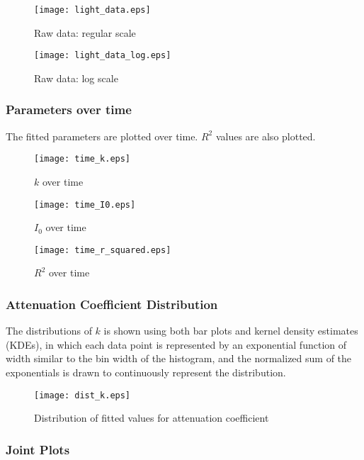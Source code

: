\begin{figure}[H]
	\centering
	\texttt{[image: light\_data.eps]}
	\caption{Raw data: regular scale}
\end{figure}

\begin{figure}[H]
	\centering
	\texttt{[image: light\_data\_log.eps]}
	\caption{Raw data: log scale}
\end{figure}

\pagebreak
\subsubsection{Parameters over time}
The fitted parameters are plotted over time. $R^2$ values are also plotted.

\begin{figure}[H]
	\centering
	\texttt{[image: time\_k.eps]}
	\caption{$k$ over time}
	\label{time_k}
\end{figure}

\begin{figure}[H]
	\centering
	\texttt{[image: time\_I0.eps]}
	\caption{$I_0$ over time}
	\label{time_I0}
\end{figure}

\begin{figure}[H]
	\centering
	\texttt{[image: time\_r\_squared.eps]}
	\caption{$R^2$ over time}
	\label{time_r_squared}
\end{figure}

\subsubsection{Attenuation Coefficient Distribution}
The distributions of $k$ is shown using both bar plots and kernel density estimates (KDEs), in which each data point is represented by an exponential function of width similar to the bin width of the histogram, and the normalized sum of the exponentials is drawn to continuously represent the distribution.

\begin{figure}[H]
	\centering
	\texttt{[image: dist\_k.eps]}
	\caption{Distribution of fitted values for attenuation coefficient}
\end{figure}

\subsubsection{Joint Plots}

